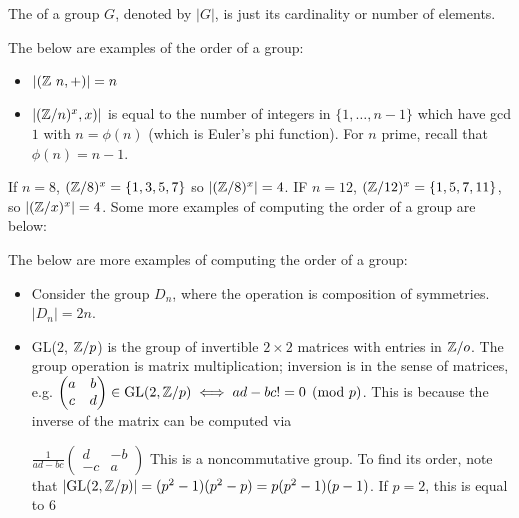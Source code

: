 \documentclass[12pt]{scrartcl}
\begin{document}
\begin{definition}
    The  of a group $G$, denoted by $|G|$, is just its cardinality or number of elements.
\end{definition}

\begin{example}
    The below are examples of the order of a group:
    \begin{itemize}
        \item $|(\mathbb Z \ n, +)| = n$
        \item $|(\mathbb Z / n)^x, x)|$ is equal to the number of integers in $\{1, \ldots, n-1\}$ which have gcd $1$ with $n = \phi(n)$ (which is Euler's phi function). For $n$ prime, recall that $\phi(n) = n-1$.
    \end{itemize}
\end{example}

If $n = 8$, $(\mathbb Z / 8)^x = \{1, 3, 5, 7\}$ so $|(\mathbb Z / 8)^x| = 4$. IF $n = 12$, $(\mathbb Z / 12)^x = \{1, 5, 7, 11\}$, so $|(\mathbb Z / x)^x| = 4$. Some more examples of computing the order of a group are below:

\begin{example}
    The below are more examples of computing the order of a group:
    \begin{itemize}
        \item Consider the group $D_n$, where the operation is composition of symmetries. $|D_n| = 2n$.

        \item GL($2$, $\mathbb Z / p$) is the group of invertible $2 \times 2$ matrices with entries in $\mathbb Z / o$. The group operation is matrix multiplication; inversion is in the sense of matrices, e.g. 
        $\begin{pmatrix}
            a & b \\
            c & d
        \end{pmatrix} \in \text{GL}(2, \mathbb Z / p) \iff ad - bc != 0 \pmod p$. This is because the inverse of the matrix can be computed via 
        
        $\frac{1}{ad-bc} 
        \begin{pmatrix}
            d & -b \\
            -c & a
        \end{pmatrix}$ This is a noncommutative group. To find its order, note that $|\text{GL}(2, \mathbb Z / p)| = (p^2-1)(p^2-p) = p(p^2-1)(p-1)$. If $p = 2$, this is equal to $6$  
    \end{itemize}
\end{example}
\end{document}
